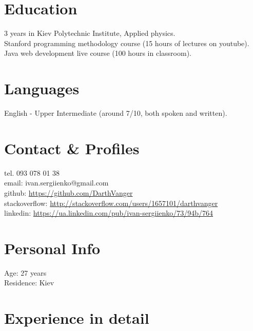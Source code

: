 \documentclass[a4paper, 14pt]{article}
\begin{document}
\section{Education}
	3 years in Kiev Polytechnic Institute, Applied physics. \\
	Stanford programming methodology course (15 hours of lectures on youtube). \\
	Java web development live course (100 hours in classroom). \\
\section{Languages}
	English - Upper Intermediate (around 7/10, both spoken and written).
\section{Contact \& Profiles}
	tel. 093 078 01 38 \\
	email: ivan.sergiienko@gmail.com \\
    github: \url{https://github.com/DarthVanger} \\
    stackoverflow: \url{http://stackoverflow.com/users/1657101/darthvanger} \\
    linkedin: \url{https://ua.linkedin.com/pub/ivan-sergiienko/73/94b/764}
\section{Personal Info}
	Age: 27 years \\
	Residence: Kiev

\section{Experience in detail}
\end{document}
